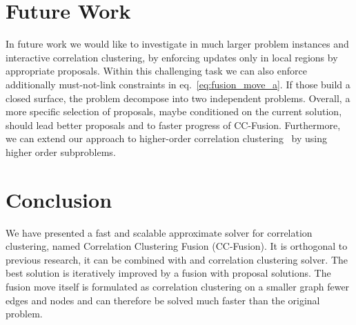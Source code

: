 \documentclass[10pt,twocolumn,letterpaper]{article}
\theoremstyle{definition}
\begin{document}



% 



%


\section{Future Work}\label{sec:future}
In future work we would like to investigate in much larger problem instances
and interactive correlation clustering, by enforcing
updates only in local regions by appropriate proposals.
%
Within this challenging task we can also enforce additionally must-not-link constraints in eq.~\ref{eq:fusion_move_a}.
If those build a closed surface, the problem decompose into two independent problems.
%
Overall, a more specific selection of proposals, maybe conditioned on the current solution,
should lead better proposals and to faster progress of CC-Fusion.
%
Furthermore, we can extend our approach to higher-order correlation clustering~\cite{Kim-2011,kappes_2013_arxiv}
by using higher order subproblems.


\section{Conclusion}\label{sec:conclusion}

We have presented a fast and scalable 
approximate solver for correlation 
clustering, named Correlation Clustering Fusion (CC-Fusion).
It is orthogonal to previous research, \ie it can be combined with and
correlation clustering solver.
%
The best solution is iteratively improved 
by a fusion with proposal solutions.
The fusion move itself is formulated as correlation
clustering on a smaller graph fewer edges and nodes
and can therefore be solved much faster than the original problem.
\end{document}
